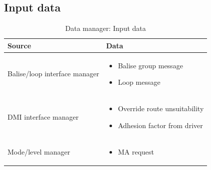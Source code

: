\documentclass[nocc]{template/openetcs_report}
\begin{document}
\subsection{Input data}
			\begin{longtable}{|l|l|}
				\caption{Data manager: Input data}\\ 
				\hline
				
					\begin{minipage}[t]{0.35\linewidth} \textbf{Source}	\end{minipage} 
				&	\begin{minipage}[t]{0.65\linewidth} \textbf{Data} \end{minipage} \\
				
				\hline
																																									
					\begin{minipage}[t]{0.35\linewidth} Balise/loop interface manager	\end{minipage} 
				&	\begin{minipage}[t]{0.65\linewidth}
						\begin{itemize}
							\item Balise group message
							\item Loop message						
						\end{itemize}
					\end{minipage} \\
				
				\hline
				
					\begin{minipage}[t]{0.35\linewidth} DMI interface manager	\end{minipage} 
				&	\begin{minipage}[t]{0.65\linewidth}
						\begin{itemize}
							\item Override route unsuitability
							\item Adhesion factor from driver
						\end{itemize}			
					\end{minipage} \\
				
				\hline
					
					\begin{minipage}[t]{0.35\linewidth} Mode/level manager	\end{minipage} 
				&	\begin{minipage}[t]{0.65\linewidth}
						\begin{itemize}
							\item MA request
						\end{itemize}			
					\end{minipage} \\
				

\end{longtable}
\end{document}
